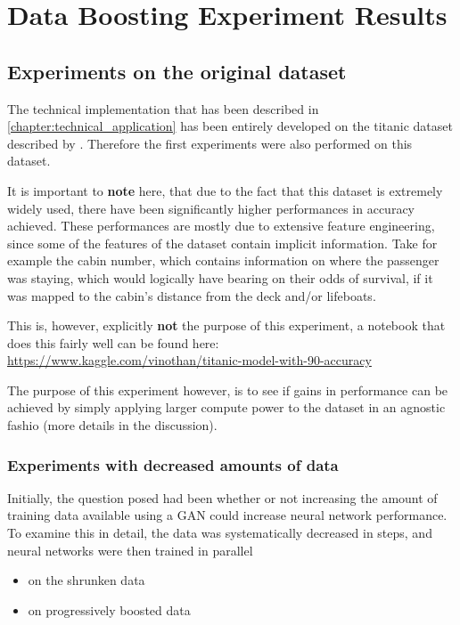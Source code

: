 \chapter{Data Boosting Experiment Results}

\section{Experiments on the original dataset}

The technical implementation that has been described in \ref{chapter:technical_application} has been entirely developed on the titanic dataset described by \cite{titanic}. 
Therefore the first experiments were also performed on this dataset.

It is important to \textbf{note} here, that due to the fact that this dataset is extremely widely used, there have been significantly higher performances in accuracy achieved.
These performances are mostly due to extensive feature engineering, since some of the features of the dataset contain implicit information. 
Take for example the cabin number, which contains information on where the passenger was staying, which would logically have bearing on their odds of survival, if it was mapped to the cabin's
distance from the deck and/or lifeboats.

This is, however, explicitly \textbf{not} the purpose of this experiment, a notebook that does this fairly well can be found here: \url{https://www.kaggle.com/vinothan/titanic-model-with-90-accuracy} 

The purpose of this experiment however, is to see if gains in performance can be achieved by simply applying larger compute power to the dataset in an agnostic fashio (more details in the discussion).

\subsection{Experiments with decreased amounts of data}

Initially, the question posed had been whether or not increasing the amount of training data available using a \ac{GAN} could increase neural network performance.
To examine this in detail, the data was systematically decreased in steps, and neural networks were then trained in parallel 

\begin{itemize}
	\item on the shrunken data 
	\item on progressively boosted data
\end{itemize}

